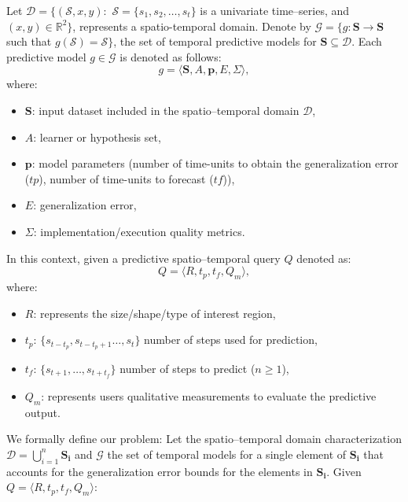 Let $\mathcal{D} = \{(\mathcal{S}, x, y): \,\, \mathcal{S} = \{s_{1}, s_{2}, \ldots, s_{t}\}$ is a univariate time--series, and $(x,y) \in \mathbb{R}^{2}\}$, represents a spatio-temporal domain. Denote by $\mathcal{G} = \{g: \mathbf{S} \to \mathbf{S}$ such that $g(\mathcal{S}) = \mathcal{S}\}$, the set of temporal predictive models for $\mathbf{S} \subseteq \mathcal{D}$. Each predictive model $g\in \mathcal{G}$ is denoted as follows:
\begin{equation}
\label{eq:ModelDefinition}
g = \langle \mathbf{S}, A, \mathbf{p}, E, \varSigma \rangle,
\end{equation}
where:
\begin{itemize}[noitemsep,nolistsep]	
	\item $\mathbf{S}$: input dataset included in the spatio--temporal domain $\mathcal{D}$,
	\item $A$: learner or hypothesis set,
	\item $\mathbf{p}$: model parameters (number of time-units to obtain the generalization error ($tp$), number of time-units to forecast ($tf$)),
	\item $E$: generalization error,
	\item $\varSigma$: implementation/execution quality metrics.
\end{itemize}

\noindent In this context, given a predictive spatio--temporal query $Q$ denoted as:
\begin{equation} \label{eq:predictivequery}
Q = \langle R, t_{p}, t_{f}, Q_{m} \rangle,
\end{equation}
where:
\begin{itemize}[noitemsep,nolistsep]	
	\item $R$: represents the size/shape/type of interest region,
	\item $t_{p}$: $\{s_{t-t_p}, s_{t-t_{p}+1}\ldots, s_{t}\}$ number of steps used for  prediction,
	\item $t_{f}$: $\{s_{t+1}, \ldots, s_{t+t_f}\}$ number of steps to predict ($n\geq 1$),
	\item $Q_{m}$: represents users qualitative measurements to evaluate the predictive output.
\end{itemize}

We formally define our problem: Let the spatio--temporal domain characterization $\mathcal{D} = \bigcup_{i=1}^{n} \mathbf{S_i}$ and $\mathcal{G}$ the set of temporal models for a single element of $\mathbf{S_i}$ that accounts for the generalization error bounds for the elements in $\mathbf{S_i}$. Given $Q = \langle R, t_p, t_f, Q_{m} \rangle$:

